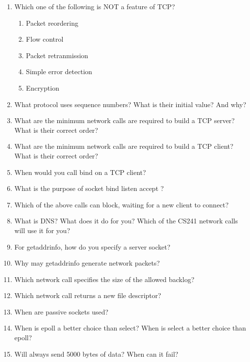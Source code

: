 \begin{enumerate}
\item Which one of the following is NOT a feature of TCP?
  \begin{enumerate}
  \item Packet reordering
  \item Flow control
  \item Packet retranmission
  \item Simple error detection
  \item Encryption
  \end{enumerate}

\item What protocol uses sequence numbers? What is their initial value? And why?

\item What are the minimum network calls are required to build a TCP server? What is their correct order?

\item What are the minimum network calls are required to build a TCP client? What is their correct order?

\item When would you call bind on a TCP client?

\item What is the purpose of socket bind listen accept ?

\item Which of the above calls can block, waiting for a new client to connect?

\item What is DNS? What does it do for you? Which of the CS241 network calls will use it for you?

\item For getaddrinfo, how do you specify a server socket?

\item Why may getaddrinfo generate network packets?

\item Which network call specifies the size of the allowed backlog?

\item Which network call returns a new file descriptor?

\item When are passive sockets used?

\item When is epoll a better choice than select? When is select a better choice than epoll?

\item Will  always send 5000 bytes of data? When can it fail?


\end{enumerate}
